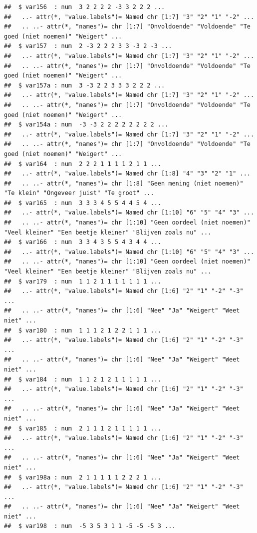 \documentclass[
]{book}
\begin{document}
\begin{verbatim}
##  $ var156  : num  3 2 2 2 2 -3 3 2 2 2 ...
##   ..- attr(*, "value.labels")= Named chr [1:7] "3" "2" "1" "-2" ...
##   .. ..- attr(*, "names")= chr [1:7] "Onvoldoende" "Voldoende" "Te goed (niet noemen)" "Weigert" ...
##  $ var157  : num  2 -3 2 2 2 3 3 -3 2 -3 ...
##   ..- attr(*, "value.labels")= Named chr [1:7] "3" "2" "1" "-2" ...
##   .. ..- attr(*, "names")= chr [1:7] "Onvoldoende" "Voldoende" "Te goed (niet noemen)" "Weigert" ...
##  $ var157a : num  3 -3 2 2 3 3 3 2 2 2 ...
##   ..- attr(*, "value.labels")= Named chr [1:7] "3" "2" "1" "-2" ...
##   .. ..- attr(*, "names")= chr [1:7] "Onvoldoende" "Voldoende" "Te goed (niet noemen)" "Weigert" ...
##  $ var154a : num  -3 -3 2 2 2 2 2 2 2 2 ...
##   ..- attr(*, "value.labels")= Named chr [1:7] "3" "2" "1" "-2" ...
##   .. ..- attr(*, "names")= chr [1:7] "Onvoldoende" "Voldoende" "Te goed (niet noemen)" "Weigert" ...
##  $ var164  : num  2 2 2 1 1 1 1 2 1 1 ...
##   ..- attr(*, "value.labels")= Named chr [1:8] "4" "3" "2" "1" ...
##   .. ..- attr(*, "names")= chr [1:8] "Geen mening (niet noemen)" "Te klein" "Ongeveer juist" "Te groot" ...
##  $ var165  : num  3 3 3 4 5 5 4 4 5 4 ...
##   ..- attr(*, "value.labels")= Named chr [1:10] "6" "5" "4" "3" ...
##   .. ..- attr(*, "names")= chr [1:10] "Geen oordeel (niet noemen)" "Veel kleiner" "Een beetje kleiner" "Blijven zoals nu" ...
##  $ var166  : num  3 3 4 3 5 5 4 3 4 4 ...
##   ..- attr(*, "value.labels")= Named chr [1:10] "6" "5" "4" "3" ...
##   .. ..- attr(*, "names")= chr [1:10] "Geen oordeel (niet noemen)" "Veel kleiner" "Een beetje kleiner" "Blijven zoals nu" ...
##  $ var179  : num  1 1 2 1 1 1 1 1 1 1 ...
##   ..- attr(*, "value.labels")= Named chr [1:6] "2" "1" "-2" "-3" ...
##   .. ..- attr(*, "names")= chr [1:6] "Nee" "Ja" "Weigert" "Weet niet" ...
##  $ var180  : num  1 1 1 2 1 2 2 1 1 1 ...
##   ..- attr(*, "value.labels")= Named chr [1:6] "2" "1" "-2" "-3" ...
##   .. ..- attr(*, "names")= chr [1:6] "Nee" "Ja" "Weigert" "Weet niet" ...
##  $ var184  : num  1 1 2 1 2 1 1 1 1 1 ...
##   ..- attr(*, "value.labels")= Named chr [1:6] "2" "1" "-2" "-3" ...
##   .. ..- attr(*, "names")= chr [1:6] "Nee" "Ja" "Weigert" "Weet niet" ...
##  $ var185  : num  2 1 1 1 2 1 1 1 1 1 ...
##   ..- attr(*, "value.labels")= Named chr [1:6] "2" "1" "-2" "-3" ...
##   .. ..- attr(*, "names")= chr [1:6] "Nee" "Ja" "Weigert" "Weet niet" ...
##  $ var198a : num  2 1 1 1 1 1 2 2 2 1 ...
##   ..- attr(*, "value.labels")= Named chr [1:6] "2" "1" "-2" "-3" ...
##   .. ..- attr(*, "names")= chr [1:6] "Nee" "Ja" "Weigert" "Weet niet" ...
##  $ var198  : num  -5 3 5 3 1 1 -5 -5 -5 3 ...

\end{verbatim}
\end{document}
